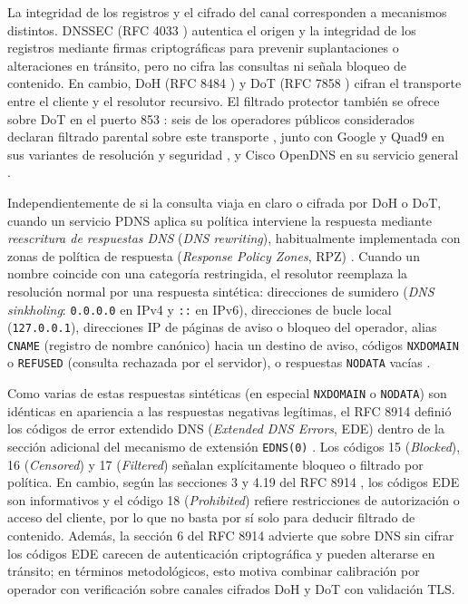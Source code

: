 \documentclass[10pt,a4paper]{article}
\begin{document}
La integridad de los registros y el cifrado del canal corresponden a mecanismos distintos. DNSSEC (RFC 4033 \cite{rfc4033}) autentica el origen y la integridad de los registros mediante firmas criptográficas para prevenir suplantaciones o alteraciones en tránsito, pero no cifra las consultas ni señala bloqueo de contenido. En cambio, DoH (RFC 8484 \cite{rfc8484}) y DoT (RFC 7858 \cite{rfc7858}) cifran el transporte entre el cliente y el resolutor recursivo. El filtrado protector también se ofrece sobre DoT en el puerto 853 \cite{rfc7858,liu2024}: seis de los operadores públicos considerados declaran filtrado parental sobre este transporte \cite{cloudflare,adguardpublic,cleanbrowsingfree,controldfree,mullvaddns,dns4euperfiles}, junto con Google y Quad9 en sus variantes de resolución y seguridad \cite{google,quad9}, y Cisco OpenDNS en su servicio general \cite{opendnssetup}.

Independientemente de si la consulta viaja en claro o cifrada por DoH o DoT, cuando un servicio PDNS aplica su política interviene la respuesta mediante \emph{reescritura de respuestas DNS} (\emph{DNS rewriting}), habitualmente implementada con zonas de política de respuesta (\emph{Response Policy Zones}, RPZ) \cite{liu2024}. Cuando un nombre coincide con una categoría restringida, el resolutor reemplaza la resolución normal por una respuesta sintética: direcciones de sumidero (\emph{DNS sinkholing}: \texttt{0.0.0.0} en IPv4 y \texttt{::} en IPv6), direcciones de bucle local (\texttt{127.0.0.1}), direcciones IP de páginas de aviso o bloqueo del operador, alias \texttt{CNAME} (registro de nombre canónico) hacia un destino de aviso, códigos \texttt{NXDOMAIN} o \texttt{REFUSED} (consulta rechazada por el servidor), o respuestas \texttt{NODATA} vacías \cite{liu2024}.

Como varias de estas respuestas sintéticas (en especial \texttt{NXDOMAIN} o \texttt{NODATA}) son idénticas en apariencia a las respuestas negativas legítimas, el RFC 8914 definió los códigos de error extendido DNS (\emph{Extended DNS Errors}, EDE) dentro de la sección adicional del mecanismo de extensión \texttt{EDNS(0)} \cite{rfc8914}. Los códigos 15 (\emph{Blocked}), 16 (\emph{Censored}) y 17 (\emph{Filtered}) señalan explícitamente bloqueo o filtrado por política. En cambio, según las secciones 3 y 4.19 del RFC 8914 \cite{rfc8914}, los códigos EDE son informativos y el código 18 (\emph{Prohibited}) refiere restricciones de autorización o acceso del cliente, por lo que no basta por sí solo para deducir filtrado de contenido. Además, la sección 6 del RFC 8914 advierte que sobre DNS sin cifrar los códigos EDE carecen de autenticación criptográfica y pueden alterarse en tránsito; en términos metodológicos, esto motiva combinar calibración por operador con verificación sobre canales cifrados DoH y DoT con validación TLS.
\end{document}
